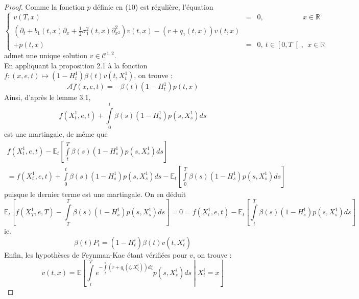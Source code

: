 \documentclass[a4paper]{article}
\theoremstyle{definition}
\theoremstyle{remark}
\begin{document}
\begin{proof}

Comme la fonction $p$ définie en (10) est régulière, l'équation
\begin{equation*}
\left\{
\begin{split}
v(T, x) &=& 0,\qquad \qquad \quad \ \ x \in \mathbb{R} \\
\left(\partial_t + b_1(t,x)\partial_{x} + \frac{1}{2}\sigma_1^2(t,x)\partial^2_{x^2}\right)v(t,x) - (r+q_1(t,x))v(t,x) \\+ p(t,x) &=&0, \ t\in\left[0,T\right[,\ \ x \in \mathbb{R}
\end{split}
\right.
\end{equation*}
admet une unique solution $v \in  \mathcal{C}^{1, 2}$.  \\ 
En appliquant la proposition 2.1 à la fonction $f : (x,e,t) \mapsto (1 - H^1_t)\beta(t) v(t,X^1_t)$, on trouve :
\begin{equation*}
\mathcal{A}f(x,e,t) = -\beta(t) (1 - H^1_t) p(t,x)
\end{equation*}
Ainsi, d'après le lemme 3.1,  
\begin{equation*}
 f(X_t^1, e, t) + \int \limits_{0}^{t}\beta(s)(1-H^{1}_{s})p(s, X^{1}_s)ds 
\end{equation*}
est une martingale, de même que
\begin{multline*}
 f(X_t^1, e, t) - \mathbb{E}_t \left[ \int \limits_{t}^{T}\beta(s)(1-H^{1}_{s})p(s, X^{1}_s)ds \right]\\ = f(X_t^1, e, t) + \int \limits_{0}^{t}\beta(s)(1-H^{1}_{s})p(s, X^{1}_s)ds  - \mathbb{E}_t \left[  \int \limits_{0}^{T}\beta(s)(1-H^{1}_{s})p(s, X^{1}_s)ds \right]
\end{multline*}
puisque le dernier terme est une martingale. On en déduit 
\begin{equation*}
\mathbb{E}_t \left[f(X_T^1, e, T) - \int \limits_{T}^{T}\beta(s)(1-H^{1}_{s})p(s, X^{1}_s)ds \right] = 0 = f(X^1_t, e, t) - \mathbb{E}_t \left[ \int \limits_{t}^{T}\beta(s)(1-H^{1}_{s})p(s, X^{1}_s)ds \right]
\end{equation*}
ie.
\begin{equation*}
\beta(t)P_{t}  = (1 - H^i_t)\beta(t)v(t,X_t^i)
\end{equation*}
Enfin, les hypothèses de Feynman-Kac étant vérifiées pour $v$, on trouve :
\begin{equation*}
v(t,x) = \mathbb{E} \left[ \int \limits_t^T e^{-\int \limits_{t}^{s} (r + q_i(\zeta, X^i_\zeta))d\zeta} p(s, X^i_s)ds \middle| X^i_t = x\right]
\end{equation*}
\end{proof}
\end{document}
